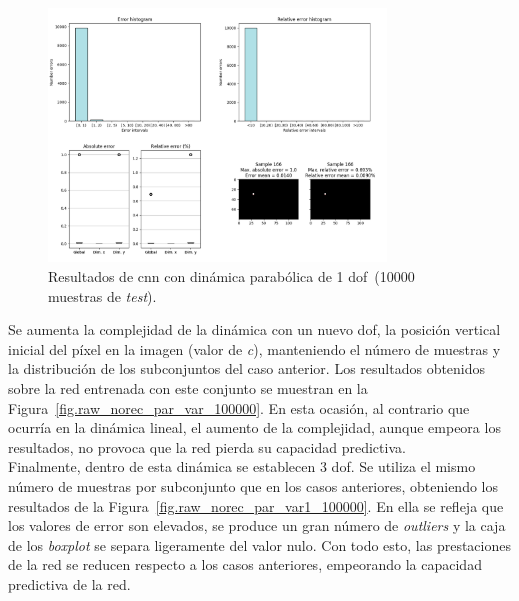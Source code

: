 \begin{figure}[H]
		\begin{center}
			\includegraphics[width=0.8\textwidth]{ figures/test_raw/NOREC/parabolic_fix_100000.png}
			\caption{Resultados de \acrshort{cnn} con dinámica parabólica de 1 \acrshort{dof}~(10000 muestras de \textit{test}).}
			\label{fig.raw_norec_par_fix_100000}
		\end{center}
\end{figure}
\vspace{-10pt}

Se aumenta la complejidad de la dinámica con un nuevo \acrshort{dof}, la posición vertical inicial del píxel en la imagen (valor de \textit{c}), manteniendo el número de muestras y la distribución de los subconjuntos  del caso anterior. Los resultados obtenidos sobre la red entrenada con este conjunto se muestran en la Figura~\ref{fig.raw_norec_par_var_100000}. En esta ocasión, al contrario que ocurría en la dinámica lineal, el aumento de la complejidad, aunque empeora los resultados, no provoca que la red pierda su capacidad predictiva.\\

Finalmente, dentro de esta dinámica se establecen 3 \acrshort{dof}. Se utiliza el mismo número de muestras por subconjunto que en los casos anteriores, obteniendo los resultados de la Figura~\ref{fig.raw_norec_par_var1_100000}. En ella se refleja que los valores de error son elevados, se produce un gran número de \textit{outliers} y la caja de los \textit{boxplot} se separa ligeramente del valor nulo. Con todo esto, las prestaciones de la red se reducen respecto a los casos anteriores, empeorando la capacidad predictiva de la red.


